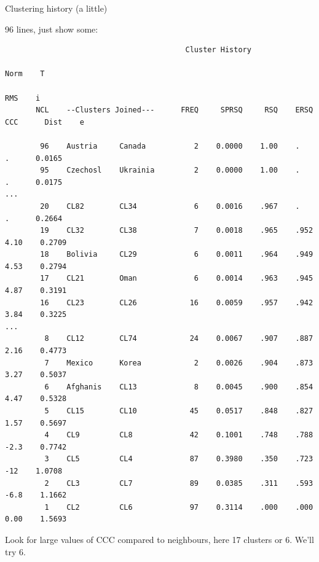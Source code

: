 \documentclass[pdf]{prosper}
\begin{document}
\begin{slide}{Clustering history (a little)}

96 lines, just show some:

{\tiny
\begin{verbatim}
                                         Cluster History
                                                                                    Norm    T
                                                                                     RMS    i
       NCL    --Clusters Joined---      FREQ     SPRSQ     RSQ    ERSQ     CCC      Dist    e

        96    Austria     Canada           2    0.0000    1.00    .        .      0.0165
        95    Czechosl    Ukrainia         2    0.0000    1.00    .        .      0.0175 
...
        20    CL82        CL34             6    0.0016    .967    .        .      0.2664
        19    CL32        CL38             7    0.0018    .965    .952    4.10    0.2709
        18    Bolivia     CL29             6    0.0011    .964    .949    4.53    0.2794
        17    CL21        Oman             6    0.0014    .963    .945    4.87    0.3191
        16    CL23        CL26            16    0.0059    .957    .942    3.84    0.3225 
...
         8    CL12        CL74            24    0.0067    .907    .887    2.16    0.4773
         7    Mexico      Korea            2    0.0026    .904    .873    3.27    0.5037
         6    Afghanis    CL13             8    0.0045    .900    .854    4.47    0.5328
         5    CL15        CL10            45    0.0517    .848    .827    1.57    0.5697
         4    CL9         CL8             42    0.1001    .748    .788    -2.3    0.7742
         3    CL5         CL4             87    0.3980    .350    .723     -12    1.0708
         2    CL3         CL7             89    0.0385    .311    .593    -6.8    1.1662
         1    CL2         CL6             97    0.3114    .000    .000    0.00    1.5693

\end{verbatim}
}

Look for large values of CCC compared to neighbours, here 17 clusters or 6. We'll try 6.
  
\end{slide}
\end{document}
